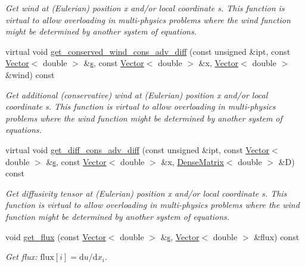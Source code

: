 \begin{DoxyCompactItemize}
\begin{DoxyCompactList}\small\item\em Get wind at (Eulerian) position x and/or local coordinate s. This function is virtual to allow overloading in multi-\/physics problems where the wind function might be determined by another system of equations. \end{DoxyCompactList}\item 
virtual void \hyperlink{classoomph_1_1GeneralisedAdvectionDiffusionEquations_aff553670fb9ced08f958005b611f80cb}{get\+\_\+conserved\+\_\+wind\+\_\+cons\+\_\+adv\+\_\+diff} (const unsigned \&ipt, const \hyperlink{classoomph_1_1Vector}{Vector}$<$ double $>$ \&\hyperlink{cfortran_8h_ab7123126e4885ef647dd9c6e3807a21c}{s}, const \hyperlink{classoomph_1_1Vector}{Vector}$<$ double $>$ \&x, \hyperlink{classoomph_1_1Vector}{Vector}$<$ double $>$ \&wind) const
\begin{DoxyCompactList}\small\item\em Get additional (conservative) wind at (Eulerian) position x and/or local coordinate s. This function is virtual to allow overloading in multi-\/physics problems where the wind function might be determined by another system of equations. \end{DoxyCompactList}\item 
virtual void \hyperlink{classoomph_1_1GeneralisedAdvectionDiffusionEquations_a1d9266d37b622068414bda1e71f9f090}{get\+\_\+diff\+\_\+cons\+\_\+adv\+\_\+diff} (const unsigned \&ipt, const \hyperlink{classoomph_1_1Vector}{Vector}$<$ double $>$ \&\hyperlink{cfortran_8h_ab7123126e4885ef647dd9c6e3807a21c}{s}, const \hyperlink{classoomph_1_1Vector}{Vector}$<$ double $>$ \&x, \hyperlink{classoomph_1_1DenseMatrix}{Dense\+Matrix}$<$ double $>$ \&D) const
\begin{DoxyCompactList}\small\item\em Get diffusivity tensor at (Eulerian) position x and/or local coordinate s. This function is virtual to allow overloading in multi-\/physics problems where the wind function might be determined by another system of equations. \end{DoxyCompactList}\item 
void \hyperlink{classoomph_1_1GeneralisedAdvectionDiffusionEquations_a708e237798252ad6b207b14a627e7ec0}{get\+\_\+flux} (const \hyperlink{classoomph_1_1Vector}{Vector}$<$ double $>$ \&\hyperlink{cfortran_8h_ab7123126e4885ef647dd9c6e3807a21c}{s}, \hyperlink{classoomph_1_1Vector}{Vector}$<$ double $>$ \&flux) const
\begin{DoxyCompactList}\small\item\em Get flux\+: $\mbox{flux}[i] = \mbox{d}u / \mbox{d}x_i $. \end{DoxyCompactList}\item 

\end{DoxyCompactItemize}
